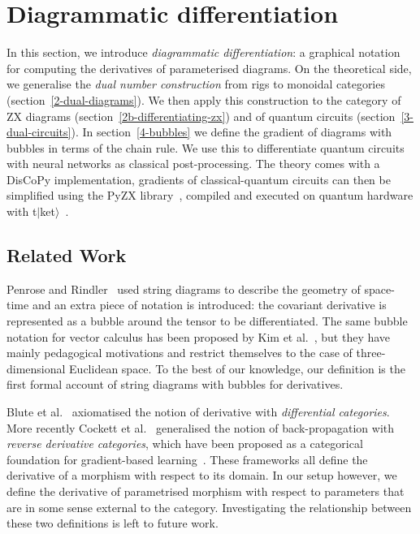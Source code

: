
\section{Diagrammatic differentiation}

In this section, we introduce \emph{diagrammatic differentiation}: a graphical notation for computing the derivatives of parameterised diagrams.
On the theoretical side, we generalise the \emph{dual number construction} from rigs to monoidal categories (section~\ref{2-dual-diagrams}).
We then apply this construction to the category of ZX diagrams (section~\ref{2b-differentiating-zx}) and of quantum circuits (section~\ref{3-dual-circuits}).
In section~\ref{4-bubbles} we define the gradient of diagrams with bubbles in terms of the chain rule.
We use this to differentiate quantum circuits with neural networks as classical post-processing.
The theory comes with a DisCoPy implementation, gradients of classical-quantum circuits can then
be simplified using the PyZX library~\cite{KissingerVanDeWetering19}, compiled and executed
on quantum hardware with t$\vert$ket$\rangle$~\cite{SivarajahEtAl20}.

\subsection*{Related Work}

Penrose and Rindler~\cite{PenroseRindler84} used string diagrams to describe the geometry of space-time and an extra piece of notation is introduced: the covariant derivative is represented as a bubble around the tensor to be differentiated.
The same bubble notation for vector calculus has been proposed by Kim et al.~\cite{KimEtAl20}, but they have mainly pedagogical motivations and restrict themselves to the case of three-dimensional Euclidean space.
To the best of our knowledge, our definition is the first formal account of string diagrams with bubbles for derivatives.

Blute et al.~\cite{BluteEtAl06} axiomatised the notion of derivative with \emph{differential categories}.
More recently Cockett et al.~\cite{CockettEtAl19} generalised the notion of back-propagation with \emph{reverse derivative categories}, which have been proposed as a categorical foundation for gradient-based learning~\cite{CruttwellEtAl21}.
These frameworks all define the derivative of a morphism with respect to its domain.
In our setup however, we define the derivative of parametrised morphism with respect to parameters that are in some sense external to the category.
Investigating the relationship between these two definitions is left to future work.

